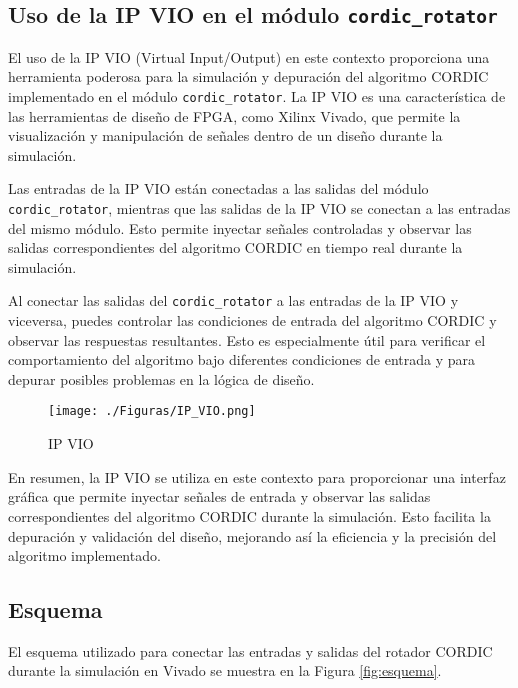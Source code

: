 \documentclass[12pt,a4paper, twoside]{article} %
\begin{document}
    

\subsection{Uso de la IP VIO en el módulo \texttt{cordic\_rotator}}

El uso de la IP VIO (Virtual Input/Output) en este contexto proporciona una herramienta poderosa para la simulación y depuración del algoritmo CORDIC implementado en el módulo \texttt{cordic\_rotator}. La IP VIO es una característica de las herramientas de diseño de FPGA, como Xilinx Vivado, que permite la visualización y manipulación de señales dentro de un diseño durante la simulación.

Las entradas de la IP VIO están conectadas a las salidas del módulo \texttt{cordic\_rotator}, mientras que las salidas de la IP VIO se conectan a las entradas del mismo módulo. Esto permite inyectar señales controladas y observar las salidas correspondientes del algoritmo CORDIC en tiempo real durante la simulación.


Al conectar las salidas del \texttt{cordic\_rotator} a las entradas de la IP VIO y viceversa, puedes controlar las condiciones de entrada del algoritmo CORDIC y observar las respuestas resultantes. Esto es especialmente útil para verificar el comportamiento del algoritmo bajo diferentes condiciones de entrada y para depurar posibles problemas en la lógica de diseño.


    \begin{figure}[ht]
    \centering
    \texttt{[image: ./Figuras/IP\_VIO.png]}
    \caption{IP VIO}
    \label{fig:ip_vio}
    \end{figure}



En resumen, la IP VIO se utiliza en este contexto para proporcionar una interfaz gráfica que permite inyectar señales de entrada y observar las salidas correspondientes del algoritmo CORDIC durante la simulación. Esto facilita la depuración y validación del diseño, mejorando así la eficiencia y la precisión del algoritmo implementado.


\subsection{Esquema}

El esquema utilizado para conectar las entradas y salidas del rotador CORDIC durante la simulación en Vivado se muestra en la Figura \ref{fig:esquema}.
\end{document}
